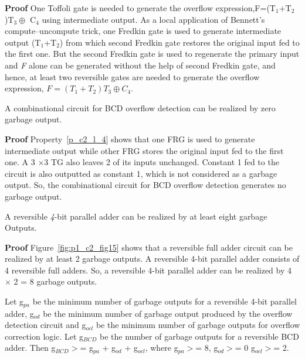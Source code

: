 \noindent\textbf{Proof}	One Toffoli gate is needed to generate the overflow expression,F=(T${}_{1}$+T${}_{2}$)T${}_{3}\oplus$ C${}_{4}$ using intermediate output. As a local application of Bennett's compute--uncompute trick, one Fredkin gate is used to generate intermediate output (T${}_{1}$+T${}_{2}$) from which second Fredkin gate restores the original input fed to the first one. But the second Fredkin gate is used to regenerate the primary input and \textit{F} alone can be generated without the help of second Fredkin gate, and hence, at least two reversible gates are needed to generate the overflow expression, $F = (T{}_{1}+T{}_{2})T{}_{3}\oplus C{}_{4}$.


\begin{property}\label{p_c2_l_4}\textnormal{
	A combinational circuit for BCD overflow detection can be realized by zero garbage output.}
\end{property}


\noindent\textbf{Proof}
	Property~\ref{p_c2_l_4} shows that one FRG is used to generate intermediate output while other FRG stores the original input fed to the first one. A 3 ${\times}$3 TG also leaves 2 of its inputs unchanged.  Constant 1 fed to the circuit is also outputted as constant 1, which is not considered as a garbage output. So, the combinational circuit for BCD overflow detection generates no garbage output.


\begin{property}\label{p_c2_l_5}\textnormal{
	A reversible {\it 4}-bit parallel adder can be realized by at least eight garbage Outputs.}
\end{property}

\noindent\textbf{Proof}
	 Figure~\ref{fig:p1_c2_fig15} shows that a reversible full adder circuit can be realized by at least 2 garbage outputs. A reversible {4}-bit parallel adder consists of 4 reversible full adders. So, a reversible {4}-bit parallel adder can be realized by 4 ${\times}$ 2 = 8 garbage outputs.


\begin{property}\label{p_c2_l_6}\textnormal{
	Let g${}_{pa}$ be the minimum number of garbage outputs for a reversible 4-bit parallel adder, g${}_{od}$ be the minimum number of garbage output produced by the overflow detection circuit and g${}_{ocl}$ be the minimum number of garbage outputs for overflow correction logic. Let g${}_{BCD}$ be the number of garbage outputs for a reversible BCD adder. Then
	g${}_{BCD}$${>}$= g${}_{pa}$ + g${}_{od}$ + g${}_{ocl}$, where g${}_{pa}$${>}$= 8, g${}_{od}$${>}$= 0 g${}_{ocl}$${>}$=  2.}
\end{property}


